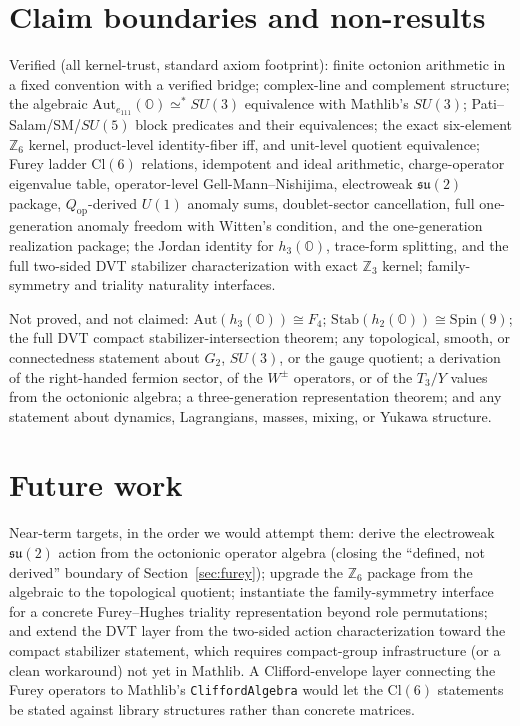 \documentclass[11pt]{article}
\newcommand{\OO}{\mathbb{O}}
\newcommand{\su}{\mathfrak{su}}
\newcommand{\leanname}[1]{\texttt{#1}}
\begin{document}
\section{Claim boundaries and non-results}
\label{sec:boundaries}

Verified (all kernel-trust, standard axiom footprint):
finite octonion arithmetic in a fixed convention with a verified bridge;
complex-line and complement structure; the algebraic
$\mathrm{Aut}_{e_{111}}(\OO) \simeq^* SU(3)$ equivalence with Mathlib's
$SU(3)$; Pati--Salam/SM/$SU(5)$ block predicates and their equivalences;
the exact six-element $\mathbb{Z}_6$ kernel, product-level identity-fiber
iff, and unit-level quotient equivalence; Furey ladder $\mathrm{Cl}(6)$
relations, idempotent and ideal arithmetic, charge-operator eigenvalue
table, operator-level Gell-Mann--Nishijima, electroweak $\su(2)$ package,
$Q_{\mathrm{op}}$-derived $U(1)$ anomaly sums, doublet-sector
cancellation, full one-generation anomaly freedom with Witten's
condition, and the one-generation realization package; the Jordan
identity for $h_3(\OO)$, trace-form splitting, and the full two-sided
DVT stabilizer characterization with exact $\mathbb{Z}_3$ kernel;
family-symmetry and triality naturality interfaces.

Not proved, and not claimed:
$\mathrm{Aut}(h_3(\OO)) \cong F_4$;
$\mathrm{Stab}(h_2(\OO)) \cong \mathrm{Spin}(9)$;
the full DVT compact stabilizer-intersection theorem;
any topological, smooth, or connectedness statement about $G_2$,
$SU(3)$, or the gauge quotient;
a derivation of the right-handed fermion sector, of the $W^\pm$
operators, or of the $T_3/Y$ values from the octonionic algebra;
a three-generation representation theorem;
and any statement about dynamics, Lagrangians, masses, mixing, or
Yukawa structure.

\section{Future work}
\label{sec:future}

Near-term targets, in the order we would attempt them:
derive the electroweak $\su(2)$ action from the octonionic operator
algebra (closing the ``defined, not derived'' boundary of
Section~\ref{sec:furey}); upgrade the $\mathbb{Z}_6$ package from the
algebraic to the topological quotient; instantiate the family-symmetry
interface for a concrete Furey--Hughes triality representation beyond
role permutations; and extend the DVT layer from the two-sided action
characterization toward the compact stabilizer statement, which requires
compact-group infrastructure (or a clean workaround) not yet in Mathlib.
A Clifford-envelope layer connecting the Furey operators to Mathlib's
\leanname{CliffordAlgebra} would let the $\mathrm{Cl}(6)$ statements be
stated against library structures rather than concrete matrices.
\end{document}
